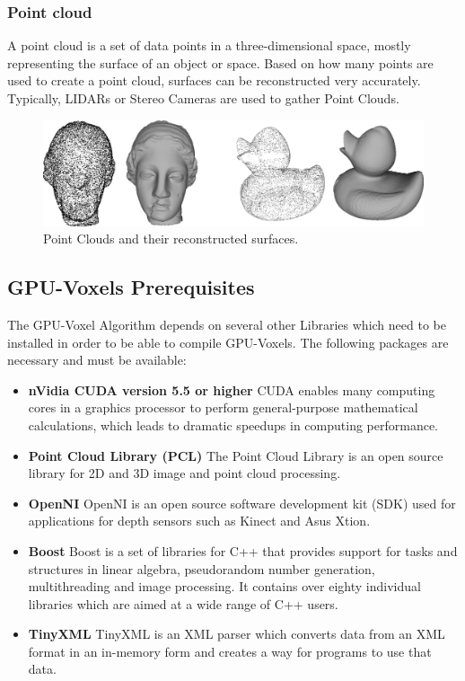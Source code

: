 \subsubsection{Point cloud}
A point cloud is a set of data points in a three-dimensional space, mostly representing the surface of an object or space. Based on how many points are used to create a point cloud, surfaces can be reconstructed very accurately. Typically, LIDARs or Stereo Cameras are used to gather Point Clouds.

\begin{figure}[h]
	\begin{center}
		\centering
		\includegraphics[width=1\linewidth]{images/point_cloud.png}
		\caption{Point Clouds and their reconstructed surfaces. \cite{fig:pc}}
		\label{fig:pointcloud}
	\end{center}
\end{figure}

\subsection{GPU-Voxels Prerequisites}
The GPU-Voxel Algorithm depends on several other Libraries which need to be installed in order to be able to compile GPU-Voxels. The following packages are necessary and must be available:

\begin{itemize}
	\item \textbf{nVidia CUDA version 5.5 or higher} \newline CUDA enables many computing cores in a graphics processor to perform general-purpose mathematical calculations, which leads to dramatic speedups in computing performance.
	\item \textbf{Point Cloud Library (PCL)} \newline The Point Cloud Library is an open source library for 2D and 3D image and point cloud processing.
	\item \textbf{OpenNI} \newline OpenNI is an open source software development kit (SDK) used for applications for depth sensors such as Kinect and Asus Xtion.
	\item  \textbf{Boost} \newline Boost is a set of libraries for C++ that provides support for tasks and structures in linear algebra, pseudorandom number generation, multithreading and image processing. It contains over eighty individual libraries which are aimed at a wide range of C++ users.
	\item  \textbf{TinyXML} \newline TinyXML is an XML parser which converts data from an XML format in an in-memory form and creates a way for programs to use that data.
\end{itemize}

